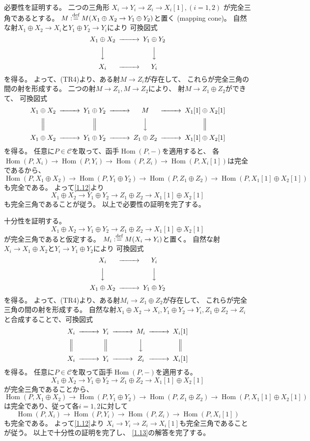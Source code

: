 \documentclass[uplatex,dvipdfmx]{jsarticle}
\makeatletter
\theoremstyle{definition}
\renewenvironment{proof}[1][\proofname]{
  \pushQED{\qed}%
  \normalfont \topsep6\p@\@plus6\p@\relax
  \trivlist
  \item[\hskip\labelsep
    #1\@addpunct{\textbf{.}}]\ignorespaces
}{%
  \popQED\endtrivlist\@endpefalse
}
\providecommand{\proofname}{証明}
\DeclareMathOperator{\Hom}{\mathrm{Hom}}
\newcommand\mcC{\mathcal{C}}
\def\dfn{:\overset{\mbox{{\scriptsize def}}}{=}}
\makeatother
\begin{document}
\begin{proof}
  必要性を証明する。
  二つの三角形
  \(X_i\to Y_i\to Z_i\to X_i[1], (i=1,2)\)
  が完全三角であるとする。
  \(M\dfn M(X_1\oplus X_2 \to Y_1\oplus Y_2)\)と置く (mapping cone)。
  自然な射\(X_1\oplus X_2\to X_i\)と\(Y_1\oplus Y_2\to Y_i\)により
  可換図式
  \[
  \begin{CD}
    X_1\oplus X_2 @>>> Y_1\oplus Y_2 \\
    @VVV @VVV \\
    X_i @>>> Y_i
  \end{CD}
  \]
  を得る。
  よって、(TR4)より、ある射\(M\to Z_i\)が存在して、
  これらが完全三角の間の射を形成する。
  二つの射\(M\to Z_1,M\to Z_2\)により、
  射\(M\to Z_1\oplus Z_2\)ができて、
  可換図式
  \[
  \begin{CD}
    X_1\oplus X_2 @>>> Y_1\oplus Y_2 @>>> M @>>> X_1[1]\oplus X_2[1] \\
    @| @| @VVV @| \\
    X_1\oplus X_2 @>>> Y_1\oplus Y_2 @>>> Z_1\oplus Z_2 @>>> X_1[1]\oplus X_2[1] \\
  \end{CD}
  \]
  を得る。
  任意に\(P\in \mcC\)を取って、函手\(\Hom(P,-)\)を適用すると、
  各\(\Hom(P,X_i)\to \Hom(P,Y_i)\to \Hom(P,Z_i)\to \Hom(P,X_i[1])\)は完全であるから、
  \[
  \Hom(P,X_1\oplus X_2) \to \Hom(P,Y_1\oplus Y_2) \to
  \Hom(P,Z_1\oplus Z_2) \to \Hom(P,X_1[1]\oplus X_2[1])
  \]
  も完全である。
  よって\autoref{1.12}より
  \[X_1\oplus X_2 \to Y_1\oplus Y_2 \to Z_1\oplus Z_2 \to X_1[1]\oplus X_2[1]\]
  も完全三角であることが従う。
  以上で必要性の証明を完了する。

  十分性を証明する。
  \[X_1\oplus X_2 \to Y_1\oplus Y_2 \to Z_1\oplus Z_2 \to X_1[1]\oplus X_2[1]\]
  が完全三角であると仮定する。
  \(M_i\dfn M(X_i\to Y_i)\)と置く。
  自然な射\(X_i\to X_1\oplus X_2\)と\(Y_i\to Y_1\oplus Y_2\)により
  可換図式
  \[
  \begin{CD}
    X_i @>>> Y_i \\
    @VVV @VVV \\
    X_1\oplus X_2 @>>> Y_1\oplus Y_2
  \end{CD}
  \]
  を得る。
  よって、(TR4)より、ある射\(M_i\to Z_1\oplus Z_2\)が存在して、
  これらが完全三角の間の射を形成する。
  自然な射\(X_1\oplus X_2 \to X_i, Y_1\oplus Y_2 \to Y_i, Z_1\oplus Z_2\to Z_i\)
  と合成することで、可換図式
  \[
  \begin{CD}
    X_i @>>> Y_i @>>> M_i @>>> X_i[1] \\
    @| @| @VVV @| \\
    X_i @>>> Y_i @>>> Z_i @>>> X_i[1]
  \end{CD}
  \]
  を得る。
  任意に\(P\in \mcC\)を取って函手\(\Hom(P,-)\)を適用する。
  \[X_1\oplus X_2 \to Y_1\oplus Y_2 \to Z_1\oplus Z_2 \to X_1[1]\oplus X_2[1]\]
  が完全三角であることから、
  \[
  \Hom(P,X_1\oplus X_2) \to \Hom(P,Y_1\oplus Y_2) \to
  \Hom(P,Z_1\oplus Z_2) \to \Hom(P,X_1[1]\oplus X_2[1])
  \]
  は完全であり、従って各\(i=1,2\)に対して
  \[
  \Hom(P,X_i) \to \Hom(P,Y_i) \to \Hom(P,Z_i) \to \Hom(P,X_i[1])
  \]
  も完全である。
  よって\autoref{1.12}より
  \(X_i\to Y_i\to Z_i\to X_i[1]\)も完全三角であることが従う。
  以上で十分性の証明を完了し、
  \autoref{1.13}の解答を完了する。
\end{proof}
\end{document}
